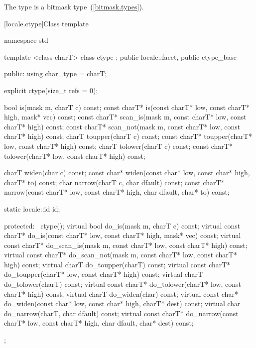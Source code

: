 \pnum
The type
is a bitmask type~(\ref{bitmask.types}).

[locale.ctype]{Class template }

%
\begin{codeblock}
namespace std {
  template <class charT>
  class ctype : public locale::facet, public ctype_base {
  public:
    using char_type = charT;

    explicit ctype(size_t refs = 0);

    bool         is(mask m, charT c) const;
    const charT* is(const charT* low, const charT* high, mask* vec) const;
    const charT* scan_is(mask m,
                         const charT* low, const charT* high) const;
    const charT* scan_not(mask m,
                          const charT* low, const charT* high) const;
    charT        toupper(charT c) const;
    const charT* toupper(charT* low, const charT* high) const;
    charT        tolower(charT c) const;
    const charT* tolower(charT* low, const charT* high) const;

    charT        widen(char c) const;
    const char*  widen(const char* low, const char* high, charT* to) const;
    char         narrow(charT c, char dfault) const;
    const charT* narrow(const charT* low, const charT* high, char dfault,
                        char* to) const;

    static locale::id id;

  protected:
   ~ctype();
    virtual bool         do_is(mask m, charT c) const;
    virtual const charT* do_is(const charT* low, const charT* high,
                               mask* vec) const;
    virtual const charT* do_scan_is(mask m,
                                    const charT* low, const charT* high) const;
    virtual const charT* do_scan_not(mask m,
                                     const charT* low, const charT* high) const;
    virtual charT        do_toupper(charT) const;
    virtual const charT* do_toupper(charT* low, const charT* high) const;
    virtual charT        do_tolower(charT) const;
    virtual const charT* do_tolower(charT* low, const charT* high) const;
    virtual charT        do_widen(char) const;
    virtual const char*  do_widen(const char* low, const char* high,
                                  charT* dest) const;
    virtual char         do_narrow(charT, char dfault) const;
    virtual const charT* do_narrow(const charT* low, const charT* high,
                                   char dfault, char* dest) const;
  };
}
\end{codeblock}

